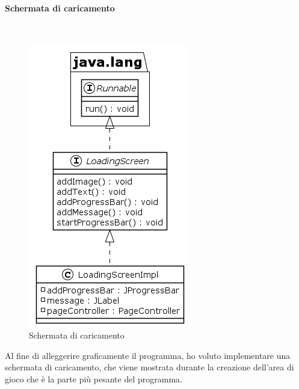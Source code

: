 \documentclass[a4paper,titlepage,12pt]{article}
\begin{document}
\paragraph{Schermata di caricamento}
\par \noindent \\
\begin{figure}[H]
    \centering
    \includegraphics[scale=0.7]{img/uml/loading_screen.png}
    \caption{Schermata di caricamento}
    \label{fig: Loading screen}
\end{figure}
\par \noindent Al fine di alleggerire graficamente il programma, ho voluto implementare una schermata di caricamento, che viene mostrata durante la creazione dell’area di gioco che è la parte più pesante del programma.
\newpage
\end{document}
